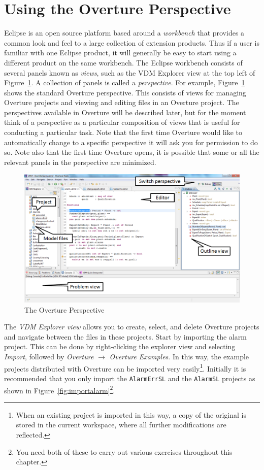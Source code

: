 \section{Using the Overture Perspective}\label{sec:vdmsupport}
Eclipse is an open source platform based around a \emph{workbench} that provides a common look and feel to a large collection of extension products. Thus if a user is familiar with one Eclipse product, it will generally be easy to start using a different product on the same workbench. The Eclipse workbench consists of several panels known as \emph{views}, such as the VDM Explorer view at the top left of Figure~\ref{fig:OverturePerspective}. A collection of panels is called a \emph{perspective}.  For example, Figure~\ref{fig:OverturePerspective} shows the standard Overture perspective. This consists of views for managing Overture projects and viewing and editing files in an Overture project. The perspectives available in Overture will be described later, but for the moment think of a perspective as a particular composition of views that is useful for conducting a particular task. Note that the first time Overture would like to automatically change to a specific perspective it will ask you for permission to do so.  Note also that the first time Overture opens, it is possible that some or all the relevant panels in the perspective are minimized.
%
\begin{figure}[tbh]
\begin{center}
  \includegraphics[width=5.5in]{figures/OverturePerspective}
  \caption[labelInTOC]{The Overture Perspective}
  \label{fig:OverturePerspective}
\end{center}
\end{figure}
%
The \emph{VDM Explorer view} allows you to create, select, and delete Overture projects and navigate between the files in these projects. Start by importing the alarm project. This can be done by right-clicking the explorer view and selecting \emph{Import}, followed by \emph{Overture} $\rightarrow$ \emph{Overture Examples}.  In this way, the example projects distributed with Overture can be imported very easily\footnote{When an existing project is imported in this way, a copy of the original is stored in the current workspace, where all further modifications are reflected.}. Initially it is recommended that you only import the \texttt{AlarmErrSL} and the \texttt{AlarmSL} projects as shown in Figure~\ref{fig:importalarm}\footnote{You need both of these to carry out various exercises throughout this chapter.}.
